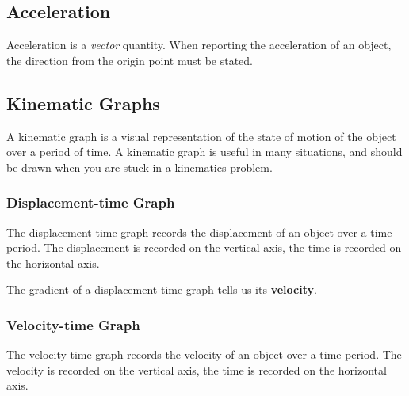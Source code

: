 \documentclass[../main.tex]{subfiles}
\begin{document}
		\subsection{Acceleration}
		Acceleration is a \textit{vector} quantity. When reporting the acceleration of an object, the direction from the origin point must be stated.
		
		\subsection{Kinematic Graphs}
		A kinematic graph is a visual representation of the state of motion of the object over a period of time. A kinematic graph is useful in many situations, and should be drawn when you are stuck in a kinematics problem.
		
		\subsubsection{Displacement-time Graph}
		The displacement-time graph records the displacement of an object over a time period. The displacement is recorded on the vertical axis, the time is recorded on the horizontal axis.
		
		\begin{center}
		\end{center}
		
		The gradient of a displacement-time graph tells us its \textbf{velocity}.
		
		\subsubsection{Velocity-time Graph}	
		The velocity-time graph records the velocity of an object over a time period. The velocity is recorded on the vertical axis, the time is recorded on the horizontal axis.
		
		\begin{center}
		\end{center}
		
\end{document}
